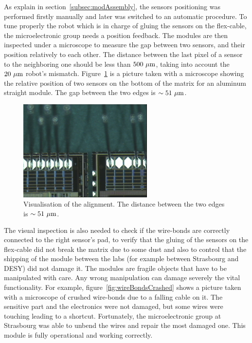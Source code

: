   As explain in section~\ref{subsec:modAssembly}, the sensors positioning was performed firstly manually and later was switched to an automatic procedure.
  To tune properly the robot which is in charge of gluing the sensors on the flex-cable, the microelectronic group needs a position feedback.
  The modules are then inspected under a microscope to measure the gap between two sensors, and their position relatively to each other.
  The distance between the last pixel of a sensor to the neighboring one should be less than $500~\mu\rm{m}$, taking into account the $20~\mu\rm{m}$ robot's mismatch.
  Figure~\ref{fig:visAlign} is a picture taken with a microscope showing the relative position of two sensors on the bottom of the matrix for an aluminum straight module.
  The gap between the two edges is $\sim 51~\mu\rm{m}$. 
  
  \begin{figure}
    \centering
    \includegraphics[width=0.6\textwidth]{Pictures/labTests/alignment_sensors.jpg}
    \caption{Visualisation of the alignment. The distance between the two edges is $\sim 51~\mu\rm{m}$.}
    \label{fig:visAlign}
  \end{figure}
  
  The visual inspection is also needed to check if the wire-bonds are correctly connected to the right sensor's pad, to verify that the gluing of the sensors on the flex-cable did not break the matrix due to some dust and also to control that the shipping of the module between the labs (for example between Strasbourg and \gls{DESY}) did not damage it.
  The modules are fragile objects that have to be manipulated with care.
  Any wrong manipulation can damage severely the vital functionality.
  For example, figure~\ref{fig:wireBondsCrashed} shows a picture taken with a microscope of crushed wire-bonds due to a falling cable on it.
  The sensitive part and the electronics were not damaged, but some wires were touching leading to a shortcut.
  Fortunately, the microelectronic group at Strasbourg was able to unbend the wires and repair the most damaged one.
  This module is fully operational and working correctly.

